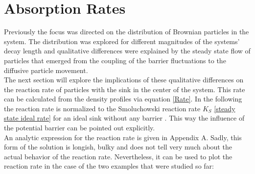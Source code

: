 \section{Absorption Rates}
Previously the focus was directed on the distribution of Brownian particles in the system. The distribution was explored for different magnitudes of the systems' decay length and qualitative differences were explained by the steady state flow of particles that emerged from the coupling of the barrier fluctuations to the diffusive particle movement.\\
The next section will explore the implications of these qualitative differences on the reaction rate of particles with the sink in the center of the system. This rate can be calculated from the density profiles via equation \eqref{Rate}. In the following the reaction rate is normalized to the Smoluchowski reaction rate $K_S$ \eqref{steady state ideal rate} for an ideal sink without any barrier . This way the influence of the potential barrier can be pointed out explicitly. \\
An analytic expression for the reaction rate is given in Appendix A.
Sadly, this form of the solution is longish, bulky and does not tell very much about the actual behavior of the reaction rate. Nevertheless, it can be used to plot the reaction rate in the case of the two examples that were studied so far: \\
